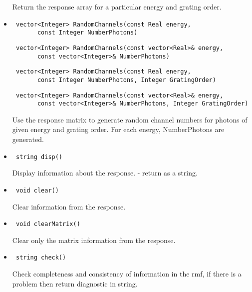 \documentclass[11pt]{book}
\begin{document}
\begin{itemize}
          Return the response array for a particular energy and
          grating order.

\item  \begin{verbatim} vector<Integer> RandomChannels(const Real energy, 
       const Integer NumberPhotons) \end{verbatim}
       \begin{verbatim} vector<Integer> RandomChannels(const vector<Real>& energy, 
       const vector<Integer>& NumberPhotons) \end{verbatim}
       \begin{verbatim} vector<Integer> RandomChannels(const Real energy, 
       const Integer NumberPhotons, Integer GratingOrder) \end{verbatim}
       \begin{verbatim} vector<Integer> RandomChannels(const vector<Real>& energy, 
       const vector<Integer>& NumberPhotons, Integer GratingOrder) \end{verbatim}

          Use the response matrix to generate random channel numbers 
          for photons of given energy and grating order. For each
          energy, NumberPhotons are generated.

\item  \begin{verbatim} string disp() \end{verbatim}

          Display information about the response. - return as a string.

\item  \begin{verbatim} void clear() \end{verbatim}

          Clear information from the response.

\item  \begin{verbatim} void clearMatrix() \end{verbatim}

          Clear only the matrix information from the response.

\item  \begin{verbatim} string check() \end{verbatim}

          Check completeness and consistency of information in the rmf,
          if there is a problem then return diagnostic in string.


\end{itemize}
\end{document}
